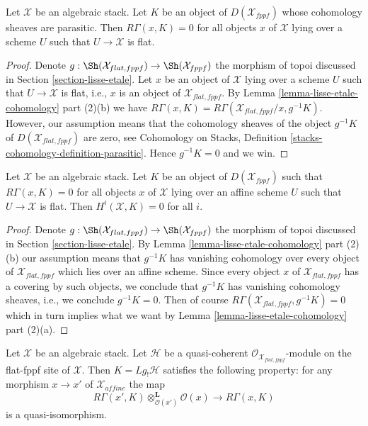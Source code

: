 \begin{lemma}
\label{lemma-cohomology-parasitic}
Let $\mathcal{X}$ be an algebraic stack. Let $K$ be an object of
$D(\mathcal{X}_{fppf})$ whose cohomology sheaves are parasitic. Then
$R\Gamma(x, K) = 0$ for all objects $x$ of $\mathcal{X}$ lying
over a scheme $U$ such that $U \to \mathcal{X}$ is flat.
\end{lemma}

\begin{proof}
Denote $g : \Sh(\mathcal{X}_{flat, fppf}) \to \Sh(\mathcal{X}_{fppf})$
the morphism of topoi discussed in Section \ref{section-lisse-etale}.
Let $x$ be an object of $\mathcal{X}$ lying over a scheme $U$
such that $U \to \mathcal{X}$ is flat, i.e., $x$ is an object
of $\mathcal{X}_{flat, fppf}$.
By Lemma \ref{lemma-lisse-etale-cohomology} part (2)(b) we have
$R\Gamma(x, K) = R\Gamma(\mathcal{X}_{flat, fppf}/x, g^{-1}K)$.
However, our assumption means that the cohomology sheaves
of the object $g^{-1}K$ of $D(\mathcal{X}_{flat, fppf})$ are zero, see
Cohomology on Stacks, Definition \ref{stacks-cohomology-definition-parasitic}.
Hence $g^{-1}K = 0$ and we win.
\end{proof}

\begin{lemma}
\label{lemma-cohomology-parasitic-complex}
Let $\mathcal{X}$ be an algebraic stack. Let $K$ be an object of
$D(\mathcal{X}_{fppf})$ such that $R\Gamma(x, K) = 0$ for all objects
$x$ of $\mathcal{X}$ lying over an affine scheme $U$ such that
$U \to \mathcal{X}$ is flat. Then $H^i(\mathcal{X}, K) = 0$ for all $i$.
\end{lemma}

\begin{proof}
Denote $g : \Sh(\mathcal{X}_{flat, fppf}) \to \Sh(\mathcal{X}_{fppf})$
the morphism of topoi discussed in Section \ref{section-lisse-etale}.
By Lemma \ref{lemma-lisse-etale-cohomology} part (2)(b) our assumption
means that $g^{-1}K$ has vanishing cohomology over every object
of $\mathcal{X}_{flat, fppf}$ which lies over an affine scheme.
Since every object $x$ of $\mathcal{X}_{flat, fppf}$ has a covering
by such objects, we conclude that $g^{-1}K$ has vanishing cohomology
sheaves, i.e., we conclude $g^{-1}K = 0$. Then of course
$R\Gamma(\mathcal{X}_{flat, fppf}, g^{-1}K) = 0$ which in turn implies
what we want by Lemma \ref{lemma-lisse-etale-cohomology} part (2)(a).
\end{proof}

\begin{lemma}
\label{lemma-higher-shriek-QC}
Let $\mathcal{X}$ be an algebraic stack. Let $\mathcal{H}$ be a quasi-coherent
$\mathcal{O}_{\mathcal{X}_{flat,fppf}}$-module  on the flat-fppf site of
$\mathcal{X}$. Then $K = Lg_!\mathcal{H}$ satisfies the following property:
for any morphism $x \to x'$ of $\mathcal{X}_{affine}$ the map
$$
R\Gamma(x', K) \otimes_{\mathcal{O}(x')}^\mathbf{L} \mathcal{O}(x)
\longrightarrow
R\Gamma(x, K)
$$
is a quasi-isomorphism.
\end{lemma}

